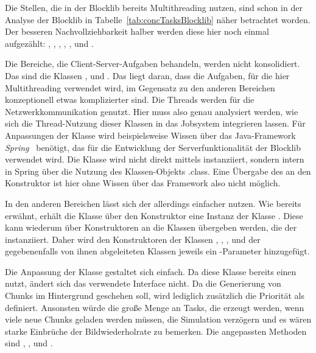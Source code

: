 Die Stellen, die in der Blocklib bereits Multithreading nutzen, sind schon in der Analyse der Blocklib in Tabelle~\ref{tab:concTasksBlocklib} näher betrachtet worden. Der besseren Nachvollziehbarkeit halber werden diese hier noch einmal aufgezählt: \classChunkStorage{}, \classEventManager{}, \classConnectionInfo{}, \classNioClientNetworkLayer{}, \classNioServerNetworkLayer{}, \classFluid{} und \classAudioManager{}.

Die Bereiche, die Client-Server-Aufgaben behandeln, werden nicht konsolidiert. Das sind die Klassen \classConnectionInfo{}, \classNioClientNetworkLayer{} und \classNioServerNetworkLayer{}. Das liegt daran, dass die Aufgaben, für die hier Multithreading verwendet wird, im Gegensatz zu den anderen Bereichen konzeptionell etwas komplizierter sind. Die Threads werden für die Netzwerkkommunikation genutzt. Hier muss also genau analysiert werden, wie sich die Thread-Nutzung dieser Klassen in das Jobsystem integrieren lassen. Für Anpassungen der Klasse \classConnectionInfo{} wird beispielsweise Wissen über das Java-Framework \emph{Spring}~\cite{VMware2022} benötigt, das für die Entwicklung der Serverfunktionalität der Blocklib verwendet wird. Die Klasse wird nicht direkt mittels  instanziiert, sondern intern in Spring über die Nutzung des Klassen-Objekts \classConnectionInfo.class{}. Eine Übergabe des \classBlocklibExecutor{} an den Konstruktor ist hier ohne Wissen über das Framework also nicht möglich.

In den anderen Bereichen lässt sich der \classBlocklibExecutorService{} allerdings einfacher nutzen. Wie bereits erwähnt, erhält die Klasse \classContext{} über den Konstruktor eine Instanz der Klasse \classBlocklibExecutor{}. Diese kann wiederum über Konstruktoren an die Klassen übergeben werden, die der \classContext{} instanziiert. Daher wird den Konstruktoren der Klassen \classChunkStorage{}, \classEventManager{}, \classFluidManager{}, \classAudioManager{} und der gegebenenfalls von ihnen abgeleiteten Klassen jeweils ein \classBlocklibExecutorService{}-Parameter hinzugefügt.

Die Anpassung der Klasse \classChunkStorage{} gestaltet sich einfach. Da diese Klasse bereits einen \classExecutor{} nutzt, ändert sich das verwendete Interface nicht. Da die Generierung von Chunks im Hintergrund geschehen soll, wird lediglich zusätzlich die Priorität als  definiert. Ansonsten würde die große Menge an Tasks, die erzeugt werden, wenn viele neue Chunks geladen werden müssen, die Simulation verzögern und es wären starke Einbrüche der Bildwiederholrate zu bemerken. Die angepassten Methoden sind	, ,  und .


